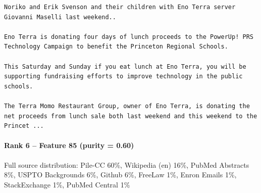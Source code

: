 \begin{verbatim}
Noriko and Erik Svenson and their children with Eno Terra server Giovanni Maselli last weekend..

Eno Terra is donating four days of lunch proceeds to the PowerUp! PRS Technology Campaign to benefit the Princeton Regional Schools.

This Saturday and Sunday if you eat lunch at Eno Terra, you will be supporting fundraising efforts to improve technology in the public schools.

The Terra Momo Restaurant Group, owner of Eno Terra, is donating the net proceeds from lunch sale both last weekend and this weekend to the Princet ...

\end{verbatim}

\paragraph*{Rank 6 -- Feature 85 (purity = 0.60)}

Full source distribution: Pile-CC 60\%, Wikipedia (en) 16\%, PubMed Abstracts 8\%, USPTO Backgrounds 6\%, Github 6\%, FreeLaw 1\%, Enron Emails 1\%, StackExchange 1\%, PubMed Central 1\%

